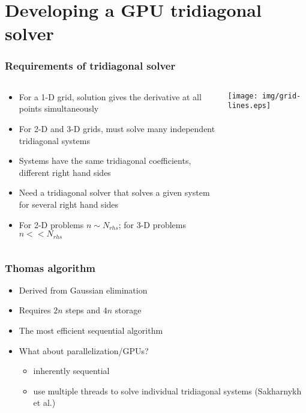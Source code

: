 \section{Developing a GPU tridiagonal solver}

\begin{frame}
\frametitle{Requirements of tridiagonal solver}
\begin{columns}
\begin{column}{0.5\textwidth}
\begin{itemize}
\item For a 1-D grid, solution gives the derivative
    at all points simultaneously
\item For 2-D and 3-D grids,
    must solve many independent tridiagonal systems
\item Systems have the same tridiagonal coefficients,
    different right hand sides
\item Need a tridiagonal solver that solves
    a given system for several right hand sides
\item For 2-D problems $n \sim N_{rhs}$;
    for 3-D problems $n << N_{rhs}$
\end{itemize}
\end{column}
\begin{column}{0.5\textwidth}
    \hspace{1cm}
    \texttt{[image: img/grid-lines.eps]}
\end{column}
\end{columns}
\end{frame}

\begin{frame}
\frametitle{Thomas algorithm}
\begin{itemize}
\item Derived from Gaussian elimination
\item Requires $2n$ steps and $4n$ storage
\item The most efficient sequential algorithm
\item What about parallelization/GPUs?
    \begin{itemize}
        \item inherently sequential
        \item use multiple threads to solve
            individual tridiagonal systems
            (Sakharnykh et al.)
    \end{itemize}
\end{itemize}
\end{frame}

